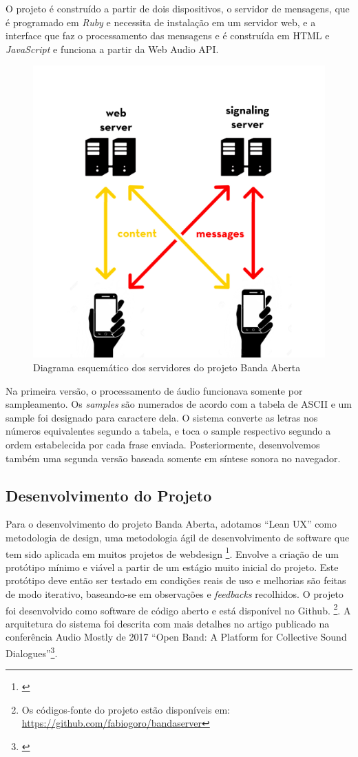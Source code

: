 O projeto é construído a partir de dois dispositivos, o servidor de mensagens, que é programado em \emph{Ruby} e necessita de instalação em um servidor web, e a interface que faz o processamento das mensagens e é construída em HTML e \emph{JavaScript} e funciona a partir da Web Audio API.    

\begin{figure}
    \caption{\label{bandaabertaserver}Diagrama esquemático dos servidores do projeto Banda Aberta}
    \begin{center}
        \includegraphics[width=0.5\linewidth]{pictures/server.jpg}
    \end{center}
\end{figure}

Na primeira versão, o processamento de áudio funcionava somente por sampleamento. Os \emph{samples} são numerados de acordo com a tabela de ASCII e um sample foi designado para caractere dela. O sistema converte as letras nos números equivalentes segundo a tabela, e toca o sample respectivo segundo a ordem estabelecida por cada frase enviada. Posteriormente, desenvolvemos também uma segunda versão baseada somente em síntese sonora no navegador.

\subsection{Desenvolvimento do Projeto}
Para o desenvolvimento do projeto Banda Aberta, adotamos ``Lean UX'' como metodologia de design, uma metodologia ágil de desenvolvimento de software que tem sido aplicada em muitos projetos de webdesign \footnote{\cite{leanux}}. Envolve a criação de um protótipo mínimo e viável a partir de um estágio muito inicial do projeto. Este protótipo deve então ser testado em condições reais de uso e melhorias são feitas de modo iterativo, baseando-se em observações e \emph{feedbacks} recolhidos. O projeto foi desenvolvido como software de código aberto e está disponível no Github. \footnote{Os códigos-fonte do projeto estão disponíveis em: \url{https://github.com/fabiogoro/bandaserver}}. A arquitetura do sistema foi descrita com mais detalhes no artigo publicado na conferência Audio Mostly de 2017 ``Open Band: A Platform for Collective Sound Dialogues''\footnote{\cite{Stolfi2017}}.

